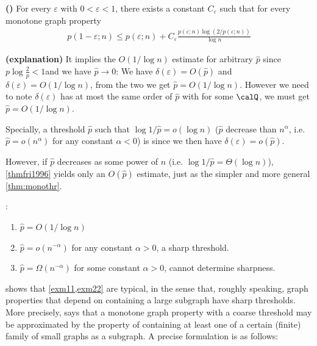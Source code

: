 \documentclass{article}
\newcommand{\bfs}[1]{\textbf{({#1}) }}
\begin{document}
\begin{thma}{\bfs{\cite{friedgut1996every}}}\label{thmfri1996}
  For every $\varepsilon$ with $0<\varepsilon<1$, there exists a constant $C_{\varepsilon}$ such that for every monotone graph property
\begin{align*}
p(1-\varepsilon ; n) \leq p(\varepsilon ; n)+C_{\varepsilon} \frac{p(\varepsilon ; n) \log (2 / p(\varepsilon ; n))}{\log n}
\end{align*}
\end{thma} 
\begin{rema}{\bfs{explanation}}
It implies the $O(1 / \log n)$ estimate for arbitrary $\widehat{p}$ since $p\log \frac{2}{p} <1$and we have $\widehat{p} \rightarrow 0$: We have $\delta(\varepsilon)=O(\widehat{p})$ and $\delta(\varepsilon)=O(1 / \log n)$, from the two we  get  $\widehat{p} = O(1 / \log n)$. However we need to note  $\delta(\varepsilon)$ has at most the same order of $\widehat{p}$ with  for some $\calQ$, we must get $\widehat{p}=O(1 / \log n)$.

Specially, a threshold $\widehat{p}$ such that $\log 1 / \widehat{p}=o(\log n)$ ($\widehat{p}$ decrease  than $n^{\alpha}$, i.e. $\widehat{p}=o(n^{\alpha})$ for any constant $\alpha<0$)
is  since we then have $\delta(\varepsilon)=o(\widehat{p})$.

However, if $\widehat{p}$ decreases as some power of $n$ (i.e. $\log 1 / \widehat{p}=\Theta(\log n)$), \cref{thmfri1996} yields only an $O(\widehat{p})$ estimate, just as the simpler and more general \cref{thm:monothr}.

:
\begin{enumerate}
    \item $\widehat{p}=O(1 / \log n)$
    \item  $\widehat{p}=o(n^{-\alpha})$ for any constant $\alpha>0$, a sharp threshold.
    \item $\widehat{p}=\Omega(n^{-\alpha})$ for some constant $\alpha>0$, cannot determine sharpness.
\end{enumerate}
\end{rema}



\cite{friedgut1999sharp} shows that \cref{exm11,exm22} are typical, in the sense that, roughly speaking, graph properties that depend on containing a large subgraph have sharp thresholds.  More precisely, \cite{friedgut1999sharp} says that a monotone graph property with a coarse threshold may be approximated by the property of containing at least one of a certain (finite) family of small graphs as a subgraph. A precise formulation is as follows:
\end{document}
